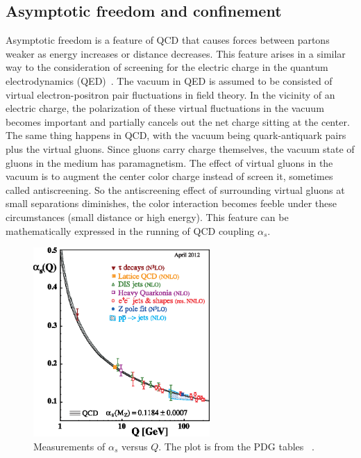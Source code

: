 \subsection{Asymptotic freedom and confinement}
Asymptotic freedom is a feature of QCD that causes forces between partons weaker
as energy increases or distance decreases. This feature arises in a similar way
to the consideration of screening for the electric charge in the quantum
electrodynamics (QED)~\cite{Feynman:1950ir, Gockeler:1997dn}. The vacuum in QED
is assumed to be consisted of virtual electron-positron pair fluctuations in
field theory. In the vicinity of an electric charge, the polarization of these
virtual fluctuations in the vacuum becomes important and partially cancels out
the net charge sitting at the center. The same thing happens in QCD, with the
vacuum being quark-antiquark pairs plus the virtual gluons. Since gluons carry
charge themselves, the vacuum state of gluons in the medium has paramagnetism.
The effect of virtual gluons in the vacuum is to augment the center color charge
instead of screen it, sometimes called antiscreening. So the antiscreening
effect of surrounding virtual gluons at small separations diminishes, the color
interaction becomes feeble under these circumstances (small distance or high
energy). This feature can be mathematically expressed in the running of QCD
coupling $\alpha_{s}$.

\begin{figure}
\centering
\includegraphics[width=0.6\textwidth]{plots/chpt2/asq.eps}
\caption[Measurements of running coupling $\alpha_{s}$ versus $Q$] {
Measurements of $\alpha_s$ versus $Q$. The plot is from the PDG tables ~\cite{Beringer:1900zz}.}
\label{fig:alpha_s}
\end{figure}

